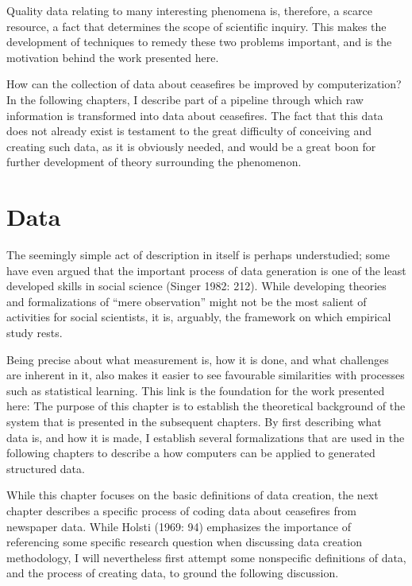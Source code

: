 \documentclass[12pt,twoside]{reedthesis}
\begin{document}
Quality data relating to many interesting phenomena is, therefore, a
scarce resource, a fact that determines the scope of scientific inquiry.
This makes the development of techniques to remedy these two problems
important, and is the motivation behind the work presented here.

How can the collection of data about ceasefires be improved by
computerization? In the following chapters, I describe part of a
pipeline through which raw information is transformed into data about
ceasefires. The fact that this data does not already exist is testament
to the great difficulty of conceiving and creating such data, as it is
obviously needed, and would be a great boon for further development of
theory surrounding the phenomenon.

\chapter{Data}\label{data}

The seemingly simple act of description in itself is perhaps
understudied; some have even argued that the important process of data
generation is one of the least developed skills in social science
(Singer 1982: 212). While developing theories and formalizations of
``mere observation'' might not be the most salient of activities for
social scientists, it is, arguably, the framework on which empirical
study rests.

Being precise about what measurement is, how it is done, and what
challenges are inherent in it, also makes it easier to see favourable
similarities with processes such as statistical learning. This link is
the foundation for the work presented here: The purpose of this chapter
is to establish the theoretical background of the system that is
presented in the subsequent chapters. By first describing what data is,
and how it is made, I establish several formalizations that are used in
the following chapters to describe a how computers can be applied to
generated structured data.

While this chapter focuses on the basic definitions of data creation,
the next chapter describes a specific process of coding data about
ceasefires from newspaper data. While Holsti (1969: 94) emphasizes the
importance of referencing some specific research question when
discussing data creation methodology, I will nevertheless first attempt
some nonspecific definitions of data, and the process of creating data,
to ground the following discussion.
\end{document}
